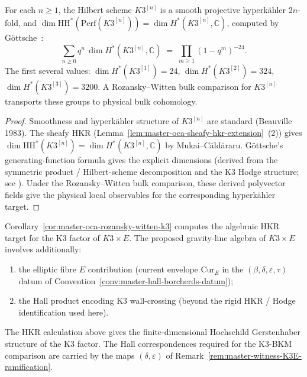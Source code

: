 \begin{corollary}
\label{cor:master-oca-k3-hilbert-hierarchy}
For each $n \geq 1$, the Hilbert scheme $K3^{[n]}$ is a smooth
projective hyperk{\"a}hler $2n$-fold, and
$\dim \mathrm{HH}^*(\mathrm{Perf}(K3^{[n]})) = \dim H^*(K3^{[n]},
\mathbb C)$, computed by Göttsche~\cite{Gottsche1990}:
\[
\sum_{n \geq 0} q^n\, \dim H^*(K3^{[n]}, \mathbb C)
\;=\;
\prod_{m \geq 1}(1-q^m)^{-24}.
\]
The first several values:
$\dim H^*(K3^{[1]}) = 24$,
$\dim H^*(K3^{[2]}) = 324$,
$\dim H^*(K3^{[3]}) = 3200$.
A Rozansky--Witten bulk comparison for $K3^{[n]}$ transports these
groups to physical bulk cohomology.
\end{corollary}

\begin{proof}
Smoothness and hyperk{\"a}hler structure of $K3^{[n]}$ are standard
\textup{(}Beauville 1983\textup{).} The sheafy HKR
\textup{(}Lemma~\ref{lem:master-oca-sheafy-hkr-extension}~\textup{(2)}\textup{)}
gives $\dim \mathrm{HH}^*(K3^{[n]}) = \dim H^*(K3^{[n]}, \mathbb C)$
by Mukai--C{\u a}ld{\u a}raru. Göttsche's generating-function formula
gives the explicit dimensions \textup{(}derived from the symmetric
product / Hilbert-scheme decomposition and the K3 Hodge structure;
see \cite{Gottsche1990}\textup{).} Under the Rozansky--Witten bulk
comparison, these derived polyvector fields give the physical local
observables for the corresponding hyperk{\"a}hler target.
\end{proof}

\begin{remark}
\label{rem:master-oca-rw-k3-cross-link}
Corollary~\ref{cor:master-oca-rozansky-witten-k3} computes the
algebraic HKR target for the K3 factor of $K3 \times E$. The proposed
gravity-line algebra
of $K3 \times E$ involves additionally:
\begin{enumerate}[label=\textup{(\arabic*)}]
\item the elliptic fibre $E$ contribution
\textup{(}current envelope $\mathrm{Cur}_E$ in the
$(\beta, \delta, \varepsilon, \tau)$ datum of
Convention~\ref{conv:master-hall-borcherds-datum}\textup{);}
\item the Hall product encoding K3 wall-crossing
\textup{(}beyond the rigid HKR / Hodge identification used
here\textup{).}
\end{enumerate}
The HKR calculation above gives the finite-dimensional Hochschild
Gerstenhaber structure of the K3 factor.  The Hall correspondences
required for the K3-BKM comparison are carried by the maps
$(\delta,\varepsilon)$ of
Remark~\ref{rem:master-witness-K3E-ramification}.
\end{remark}

